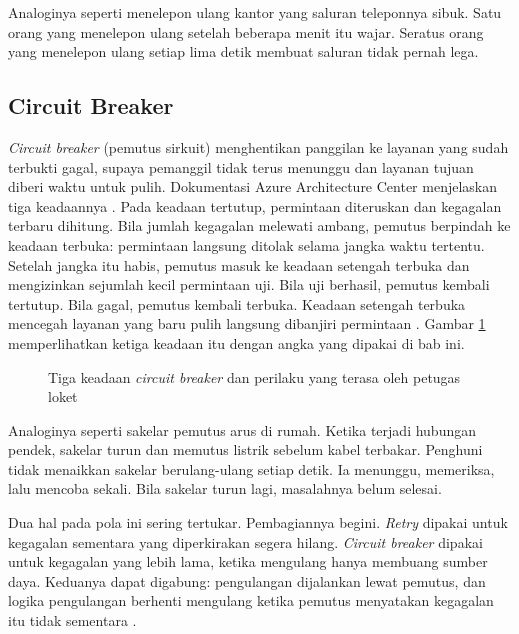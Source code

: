 Analoginya seperti menelepon ulang kantor yang saluran teleponnya sibuk. Satu orang yang menelepon
ulang setelah beberapa menit itu wajar. Seratus orang yang menelepon ulang setiap lima detik membuat
saluran tidak pernah lega.

\subsection{Circuit Breaker}

\textit{Circuit breaker} (pemutus sirkuit) menghentikan panggilan ke layanan yang sudah terbukti
gagal, supaya pemanggil tidak terus menunggu dan layanan tujuan diberi waktu untuk pulih.
Dokumentasi Azure Architecture Center menjelaskan tiga keadaannya \cite{c12-azure-circuit}. Pada
keadaan tertutup, permintaan diteruskan dan kegagalan terbaru dihitung. Bila jumlah kegagalan
melewati ambang, pemutus berpindah ke keadaan terbuka: permintaan langsung ditolak selama jangka
waktu tertentu. Setelah jangka itu habis, pemutus masuk ke keadaan setengah terbuka dan mengizinkan
sejumlah kecil permintaan uji. Bila uji berhasil, pemutus kembali tertutup. Bila gagal, pemutus
kembali terbuka. Keadaan setengah terbuka mencegah layanan yang baru pulih langsung dibanjiri
permintaan \cite{c12-azure-circuit}. Gambar \ref{fig:ch12-circuit-breaker} memperlihatkan ketiga
keadaan itu dengan angka yang dipakai di bab ini.

\begin{figure}[!htb]
  \centering
  
  \caption{Tiga keadaan \textit{circuit breaker} dan perilaku yang terasa oleh petugas loket}
  \label{fig:ch12-circuit-breaker}
\end{figure}

Analoginya seperti sakelar pemutus arus di rumah. Ketika terjadi hubungan pendek, sakelar
turun dan memutus listrik sebelum kabel terbakar. Penghuni tidak menaikkan sakelar berulang-ulang
setiap detik. Ia menunggu, memeriksa, lalu mencoba sekali. Bila sakelar turun lagi, masalahnya
belum selesai.

Dua hal pada pola ini sering tertukar. Pembagiannya begini. \textit{Retry} dipakai untuk kegagalan
sementara yang diperkirakan segera hilang. \textit{Circuit breaker} dipakai untuk kegagalan yang
lebih lama, ketika mengulang hanya membuang sumber daya. Keduanya dapat digabung: pengulangan
dijalankan lewat pemutus, dan logika pengulangan berhenti mengulang ketika pemutus menyatakan
kegagalan itu tidak sementara \cite{c12-azure-circuit}.

